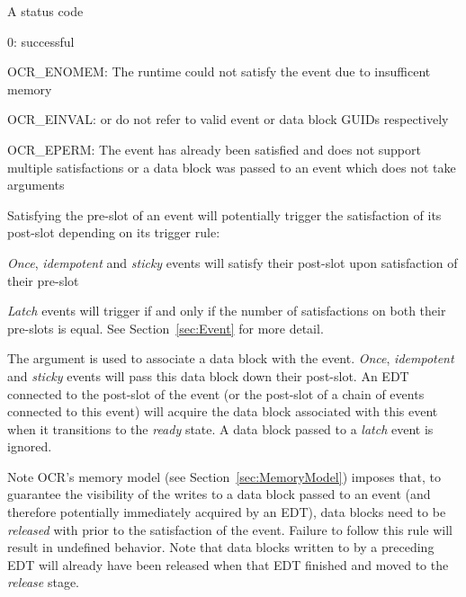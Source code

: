 \returns
A status code
\begin{DoxyItemize}
\item 0\-: successful
\item OCR\_ENOMEM: The runtime could not satisfy the event due to insufficent
  memory
\item OCR\_EINVAL:  or  do not refer
  to valid event or data block GUIDs respectively
\item OCR\_EPERM: The event has already been satisfied and does not support
  multiple satisfactions or a data block was passed to an event which does
  not take arguments
\end{DoxyItemize}

\descr
Satisfying the pre-slot of an event will potentially trigger the satisfaction of
its post-\/slot depending on its trigger rule:
\begin{DoxyItemize}
\item \emph{Once}, \emph{idempotent} and \emph{sticky} events will
  satisfy their post-slot upon satisfaction of their pre-slot
\item \emph{Latch} events will trigger if and only if the number of
  satisfactions on both their pre-slots is equal. See Section~\ref{sec:Event} for
  more detail.
\end{DoxyItemize}

The  argument is used to associate a data block with the event.
\emph{Once}, \emph{idempotent} and \emph{sticky} events will pass this data block
down their post-slot. An EDT connected to the post-slot of the event (or the post-slot
of a chain of events connected to this event) will acquire the data block
associated with this event when it transitions to the \emph{ready} state.
A data block passed to a \emph{latch} event is ignored.

\begin{DoxyNote}{Note}
OCR's memory model (see Section~\ref{sec:MemoryModel}) imposes that, to guarantee
the visibility of the writes to a data block passed to an event (and therefore
potentially immediately acquired by an EDT), data blocks need to be
\emph{released} with \hyperlink{func_ocrDbRelease}{} prior to
the satisfaction of the event. Failure to follow this rule will result in
undefined behavior. Note that data blocks written to by a preceding EDT will already
have been released when that EDT finished and moved to the \emph{release} stage.
\end{DoxyNote}
